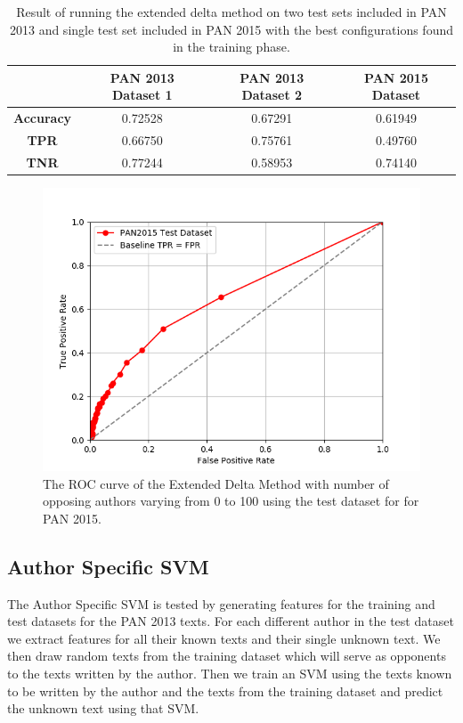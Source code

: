 \begin{table}
    \centering
    \begin{tabular}{c|ccc}
        & \textbf{PAN 2013 Dataset 1} & \textbf{PAN 2013 Dataset 2} & \textbf{PAN 2015 Dataset} \\
        \hline
        \textbf{Accuracy}  & 0.72528 & 0.67291 & 0.61949 \\
        \textbf{\gls{TPR}} & 0.66750 & 0.75761 & 0.49760 \\
        \textbf{\gls{TNR}} & 0.77244 & 0.58953 & 0.74140
    \end{tabular}
    \caption{Result of running the extended delta method on two test sets
    included in PAN 2013 and single test set included in PAN 2015 with the best
    configurations found in the training phase.}
    \label{tab:extended_delta_method_final_results}
\end{table}

\begin{figure}
    \centering
    \includegraphics[width=.7\textwidth]{./pictures/extended_delta_method_roc.png}
    \caption{The ROC curve of the Extended Delta Method with number of opposing
    authors varying from 0 to 100 using the test dataset for for PAN 2015.}
    \label{fig:extended_delta_method_roc}
\end{figure}

\subsection{Author Specific SVM} \label{subsec:results:author_specific_svm}
The Author Specific SVM is tested by generating features for the training and
test datasets for the PAN 2013 texts. For each different author in the test
dataset we extract features for all their known texts and their single unknown
text. We then draw random texts from the training dataset which will serve as
opponents to the texts written by the author. Then we train an SVM using the
texts known to be written by the author and the texts from the training dataset
and predict the unknown text using that SVM.


